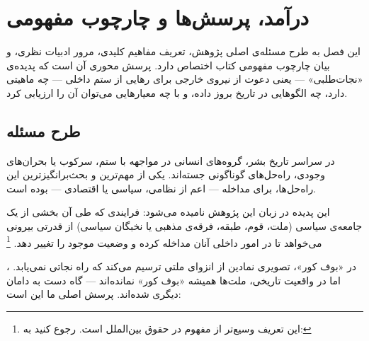 \chapter{درآمد، پرسش‌ها و چارچوب مفهومی}
\label{ch:introduction}

\begin{tcolorbox}[mybox, title={چکیده‌ی فصل}]
این فصل به طرح مسئله‌ی اصلی پژوهش، تعریف مفاهیم کلیدی، مرور ادبیات نظری، و بیان چارچوب مفهومی کتاب اختصاص دارد. پرسش محوری آن است که پدیده‌ی «نجات‌طلبی» — یعنی دعوت از نیروی خارجی برای رهایی از ستم داخلی — چه ماهیتی دارد، چه الگوهایی در تاریخ بروز داده، و با چه معیارهایی می‌توان آن را ارزیابی کرد.
\end{tcolorbox}

\section{طرح مسئله}
\label{sec:ch01-problem}

در سراسر تاریخ بشر، گروه‌های انسانی در مواجهه با ستم، سرکوب یا بحران‌های وجودی، راه‌حل‌های گوناگونی جسته‌اند. یکی از مهم‌ترین و بحث‌برانگیزترین این راه‌حل‌ها،  برای مداخله — اعم از نظامی، سیاسی یا اقتصادی — بوده است.

این پدیده در زبان این پژوهش  نامیده می‌شود: فرایندی که طی آن بخشی از یک جامعه‌ی سیاسی (ملت، قوم، طبقه، فرقه‌ی مذهبی یا نخبگان سیاسی) از قدرتی بیرونی می‌خواهد تا در امور داخلی آنان مداخله کرده و وضعیت موجود را تغییر دهد.%
\footnote{این تعریف وسیع‌تر از مفهوم  در حقوق بین‌الملل است. رجوع کنید به: }

، در «بوف کور»، تصویری نمادین از انزوای ملتی ترسیم می‌کند که راه نجاتی نمی‌یابد. اما در واقعیت تاریخی، ملت‌ها همیشه «بوف کور» نمانده‌اند — گاه دست به دامان دیگری شده‌اند. پرسش اصلی ما این است:

